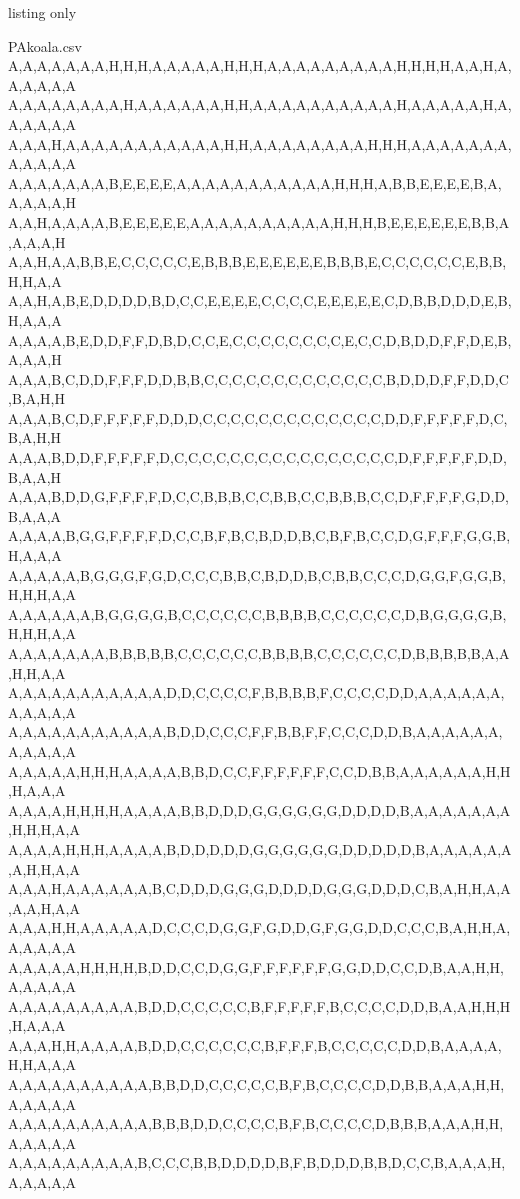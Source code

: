 \documentclass{article}
\begin{document}
\def\listcoulkoala{VertForet,Noir,GrisClair,GrisFonce,Beige,Blanc,BleuClair,VertClair,Marron}

\begin{PresentationCode}{listing only}
\begin{filecontents*}[overwrite]{PAkoala.csv}
A,A,A,A,A,A,A,H,H,H,A,A,A,A,A,H,H,H,A,A,A,A,A,A,A,A,A,H,H,H,H,A,A,H,A,A,A,A,A,A
A,A,A,A,A,A,A,A,H,A,A,A,A,A,A,H,H,A,A,A,A,A,A,A,A,A,A,H,A,A,A,A,A,H,A,A,A,A,A,A
A,A,A,H,A,A,A,A,A,A,A,A,A,A,A,H,H,A,A,A,A,A,A,A,A,H,H,H,A,A,A,A,A,A,A,A,A,A,A,A
A,A,A,A,A,A,A,B,E,E,E,E,A,A,A,A,A,A,A,A,A,A,A,H,H,H,A,B,B,E,E,E,E,B,A,A,A,A,A,H
A,A,H,A,A,A,A,B,E,E,E,E,E,A,A,A,A,A,A,A,A,A,A,H,H,H,B,E,E,E,E,E,E,B,B,A,A,A,A,H
A,A,H,A,A,B,B,E,C,C,C,C,C,E,B,B,B,E,E,E,E,E,E,B,B,B,E,C,C,C,C,C,C,E,B,B,H,H,A,A
A,A,H,A,B,E,D,D,D,D,B,D,C,C,E,E,E,E,C,C,C,C,E,E,E,E,E,C,D,B,B,D,D,D,E,B,H,A,A,A
A,A,A,A,B,E,D,D,F,F,D,B,D,C,C,E,C,C,C,C,C,C,C,C,E,C,C,D,B,D,D,F,F,D,E,B,A,A,A,H
A,A,A,B,C,D,D,F,F,F,D,D,B,B,C,C,C,C,C,C,C,C,C,C,C,C,C,B,D,D,D,F,F,D,D,C,B,A,H,H
A,A,A,B,C,D,F,F,F,F,F,D,D,D,C,C,C,C,C,C,C,C,C,C,C,C,C,D,D,F,F,F,F,F,D,C,B,A,H,H
A,A,A,B,D,D,F,F,F,F,F,D,C,C,C,C,C,C,C,C,C,C,C,C,C,C,C,C,D,F,F,F,F,F,D,D,B,A,A,H
A,A,A,B,D,D,G,F,F,F,F,D,C,C,B,B,B,C,C,B,B,C,C,B,B,B,C,C,D,F,F,F,F,G,D,D,B,A,A,A
A,A,A,A,B,G,G,F,F,F,F,D,C,C,B,F,B,C,B,D,D,B,C,B,F,B,C,C,D,G,F,F,F,G,G,B,H,A,A,A
A,A,A,A,A,B,G,G,G,F,G,D,C,C,C,B,B,C,B,D,D,B,C,B,B,C,C,C,D,G,G,F,G,G,B,H,H,H,A,A
A,A,A,A,A,A,B,G,G,G,G,B,C,C,C,C,C,C,B,B,B,B,C,C,C,C,C,C,D,B,G,G,G,G,B,H,H,H,A,A
A,A,A,A,A,A,A,B,B,B,B,B,C,C,C,C,C,C,B,B,B,B,C,C,C,C,C,C,D,B,B,B,B,B,A,A,H,H,A,A
A,A,A,A,A,A,A,A,A,A,A,D,D,C,C,C,C,F,B,B,B,B,F,C,C,C,C,D,D,A,A,A,A,A,A,A,A,A,A,A
A,A,A,A,A,A,A,A,A,A,A,B,D,D,C,C,C,F,F,B,B,F,F,C,C,C,D,D,B,A,A,A,A,A,A,A,A,A,A,A
A,A,A,A,A,H,H,H,A,A,A,A,B,B,D,C,C,F,F,F,F,F,F,C,C,D,B,B,A,A,A,A,A,A,H,H,H,A,A,A
A,A,A,A,H,H,H,H,A,A,A,A,B,B,D,D,D,G,G,G,G,G,G,D,D,D,D,B,A,A,A,A,A,A,A,H,H,H,A,A
A,A,A,A,H,H,H,A,A,A,A,B,D,D,D,D,D,G,G,G,G,G,G,D,D,D,D,D,B,A,A,A,A,A,A,A,H,H,A,A
A,A,A,H,A,A,A,A,A,A,B,C,D,D,D,G,G,G,D,D,D,D,G,G,G,D,D,D,C,B,A,H,H,A,A,A,A,H,A,A
A,A,A,H,H,A,A,A,A,A,D,C,C,C,D,G,G,F,G,D,D,G,F,G,G,D,D,C,C,C,B,A,H,H,A,A,A,A,A,A
A,A,A,A,A,H,H,H,H,B,D,D,C,C,D,G,G,F,F,F,F,F,F,G,G,D,D,C,C,D,B,A,A,H,H,A,A,A,A,A
A,A,A,A,A,A,A,A,A,B,D,D,C,C,C,C,C,B,F,F,F,F,F,B,C,C,C,C,D,D,B,A,A,H,H,H,H,A,A,A
A,A,A,H,H,A,A,A,A,B,D,D,C,C,C,C,C,C,B,F,F,F,B,C,C,C,C,C,D,D,B,A,A,A,A,H,H,A,A,A
A,A,A,A,A,A,A,A,A,A,B,B,D,D,C,C,C,C,C,B,F,B,C,C,C,C,D,D,B,B,A,A,A,H,H,A,A,A,A,A
A,A,A,A,A,A,A,A,A,A,B,B,B,D,D,C,C,C,C,B,F,B,C,C,C,C,D,B,B,B,A,A,A,H,H,A,A,A,A,A
A,A,A,A,A,A,A,A,A,B,C,C,C,B,B,D,D,D,D,B,F,B,D,D,D,B,B,D,C,C,B,A,A,A,H,A,A,A,A,A

\end{filecontents*}
\end{PresentationCode}
\end{document}
